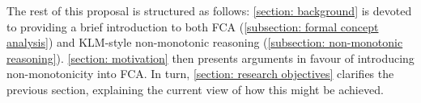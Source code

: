 The rest of this proposal is structured as follows: \cref{section: background} is devoted to providing a brief introduction to both FCA (\cref{subsection: formal concept analysis}) and KLM-style non-monotonic reasoning (\cref{subsection: non-monotonic reasoning}). \cref{section: motivation} then presents arguments in favour of introducing non-monotonicity into FCA. In turn, \cref{section: research objectives} clarifies the previous section, explaining the current view of how this might be achieved.


